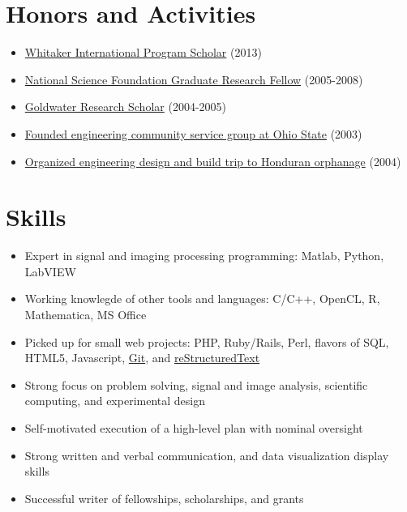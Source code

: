 \documentclass[letterpaper,10pt,english]{sphinxmanual}
\begin{document}
\chapter{Honors and Activities}
\label{resume:honors-and-activities}\begin{itemize}
\item {} 
\href{http://www.whitaker.org/grants/fellows-scholars}{Whitaker International Program
Scholar} (2013)

\item {} 
\href{http://www.nsfgrfp.org/}{National Science Foundation Graduate Research
Fellow} (2005-2008)

\item {} 
\href{https://goldwater.scholarsapply.org/}{Goldwater Research Scholar}
(2004-2005)

\item {} 
\href{http://ecos.osu.edu/}{Founded engineering community service group at Ohio
State} (2003)

\item {} 
\href{http://www.montanadeluz.org/}{Organized engineering design and build trip to Honduran
orphanage} (2004)

\end{itemize}


\chapter{Skills}
\label{resume:skills}\begin{itemize}
\item {} 
Expert in signal and imaging processing programming: Matlab, Python,
LabVIEW

\item {} 
Working knowlegde of other tools and languages: C/C++, OpenCL, R,
Mathematica, MS Office

\item {} 
Picked up for small web projects: PHP, Ruby/Rails, Perl, flavors of
SQL, HTML5, Javascript, \href{http://git-scm.com/}{Git}, and
\href{http://docutils.sf.net/rst.html}{reStructuredText}

\item {} 
Strong focus on problem solving, signal and image analysis,
scientific computing, and experimental design

\item {} 
Self-motivated execution of a high-level plan with nominal oversight

\item {} 
Strong written and verbal communication, and data visualization
display skills

\item {} 
Successful writer of fellowships, scholarships, and grants

\end{itemize}
\end{document}
